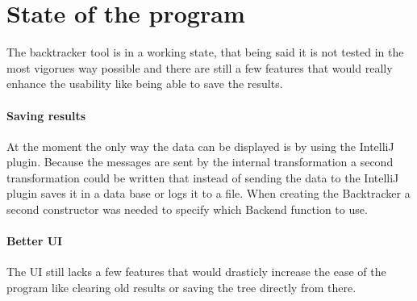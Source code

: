 \section{State of the program}
\label{fbState}
The backtracker tool is in a working state, that being said it is not tested in the most vigorues way possible and there are still a few features that would really enhance the usability like being able to save the results.

\paragraph{Saving results}
At the moment the only way the data can be displayed is by using the IntelliJ plugin. Because the messages are sent by the internal transformation a second transformation could be written that instead of sending the data to the IntelliJ plugin saves it in a data base or logs it to a file. When creating the Backtracker a second constructor was needed to specify which Backend function to use.

\paragraph{Better UI}
The UI still lacks a few features that would drasticly increase the ease of the program like clearing old results or saving the tree directly from there.
